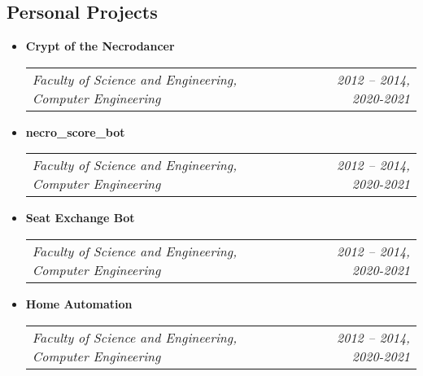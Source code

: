 \documentclass[10pt,letterpaper]{article}
\makeatletter
\newcommand{\headerrow}[2]
{\begin{tabular*}{\linewidth}{l@{\extracolsep{\fill}}r}
	#1 &
	#2 \\
\end{tabular*}}
\makeatother
\begin{document}
\subsection*{Personal Projects}

\begin{itemize}
    \parskip=0.1em

    \item 
    \textbf{Crypt of the Necrodancer}
    \\
    \headerrow
        {\emph{Faculty of Science and Engineering, Computer Engineering}}
        {\emph{2012 -- 2014, 2020-2021}}

    \item 
    \textbf{necro\_score\_bot}
    \\
    \headerrow
        {\emph{Faculty of Science and Engineering, Computer Engineering}}
        {\emph{2012 -- 2014, 2020-2021}}

    \item 
    \textbf{Seat Exchange Bot}
    \\
    \headerrow
        {\emph{Faculty of Science and Engineering, Computer Engineering}}
        {\emph{2012 -- 2014, 2020-2021}}

    \item 
    \textbf{Home Automation}
    \\
    \headerrow
        {\emph{Faculty of Science and Engineering, Computer Engineering}}
        {\emph{2012 -- 2014, 2020-2021}}

\end{itemize}
\end{document}

